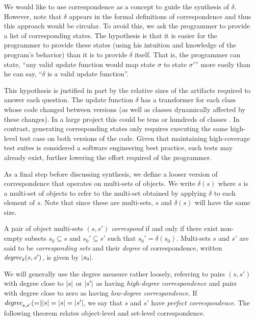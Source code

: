 We would like to use correspondence as a concept to guide the
synthesis of $\delta$.  However, note that $\delta$ appears in the
formal definitions of correspondence and thus this approach would be
circular.  To avoid this, we ask the programmer to provide a list of
corresponding states.  The hypothesis is that it is easier for the
programmer to provide these states (using his intuition and knowledge
of the program's behavior) than it is to provide $\delta$ itself.
That is, the programmer can state, ``any valid update function would
map state $\sigma$ to state $\sigma'$'' more easily than he can say,
``$\delta$ is a valid update function''.

This hypothesis is justified in part by the relative sizes of the
artifacts required to answer each question.  The update function
$\delta$ has a transformer for each class whose code changed between
versions (as well as classes dynamically affected by these changes).
In a large project this could be tens or hundreds of classes
.  In contrast, generating
corresponding states only requires executing the same high-level test
case on both versions of the code.  Given that maintaining
high-coverage test suites is considered a software engineering best
practice, such tests may already exist, further lowering the effort
required of the programmer.

As a final step before discussing synthesis, we define a looser
version of correspondence that operates on multi-sets of objects.  We
write $\delta(s)$ where $s$ is a multi-set of objects to refer to the
multi-set obtained by applying $\delta$ to each element of $s$.  Note
that since these are multi-sets, $s$ and $\delta(s)$ will have the
same size.

\begin{defn}
A pair of object multi-sets $(s, s')$ \emph{correspond} if and only if
there exist non-empty subsets $s_0 \subseteq s$ and $s_0' \subseteq
s'$ such that $s_0' = \delta(s_0)$.  Multi-sets $s$ and $s'$ are said
to be \emph{corresponding sets} and their \emph{degree} of
correspondence, written $\textit{degree}_{\delta}(s,s')$, is given by $\lvert s_0 \rvert$.
\end{defn}

We will generally use the degree measure rather loosely, referring to
pairs $(s, s')$ with degree close to $\lvert s \rvert$ or $\lvert s' \rvert$
as having \emph{high-degree correspondence} and pairs with degree
close to zero as having \emph{low-degree correspondence}.  If
$\textit{degree}_{s,s'}(=) \lvert s \rvert = \lvert s \rvert = \lvert s' \rvert$, we say
  that $s$ and $s'$ have \emph{perfect correspondence}.  The following
  theorem relates object-level and set-level correspondence.

